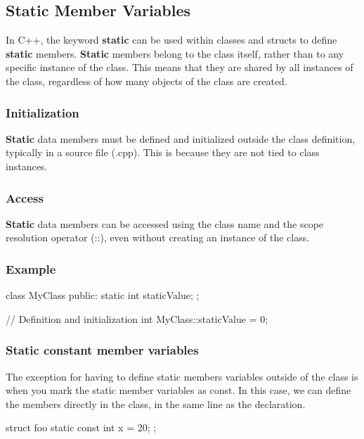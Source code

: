 \documentclass{report}
\begin{document}
    \bigbreak \noindent 
    \subsection{Static Member Variables}
    \begin{concept}
    In C++, the keyword \textbf{static} can be used within classes and structs to define \textbf{static} members. \textbf{Static} members belong to the class itself, rather than to any specific instance of the class. This means that they are shared by all instances of the class, regardless of how many objects of the class are created. 
    \bigbreak \noindent 
    \subsubsection{Initialization}
    \textbf{Static} data members must be defined and initialized outside the class definition, typically in a source file (.cpp). This is because they are not tied to class instances.
    \bigbreak \noindent 
    \subsubsection{Access}
    \bigbreak \noindent 
    \textbf{Static} data members can be accessed using the class name and the scope resolution operator (::), even without creating an instance of the class.
    \bigbreak \noindent 
    \subsubsection{Example}
    \bigbreak \noindent 
    \begin{cppcode}
        class MyClass {
        public:
            static int staticValue;
        };

        // Definition and initialization
        int MyClass::staticValue = 0;
    \end{cppcode}

    \pagebreak 
    \subsubsection{Static constant member variables}
    \bigbreak \noindent 
    The exception for having to define static members variables outside of the class is when you mark the static member variables as const. In this case, we can define the members directly in the class, in the same line as the declaration.
    \bigbreak \noindent 
    \begin{cppcode}
    struct foo {
        static const int x = 20;
    }; 


\end{cppcode}
\end{concept}
\end{document}

